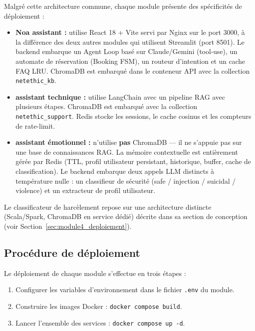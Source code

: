 Malgré cette architecture commune, chaque module présente des spécificités de déploiement :

\begin{itemize}
  \item \textbf{Noa assistant :} utilise React 18 + Vite servi par Nginx sur le port 3000,
        à la différence des deux autres modules qui utilisent Streamlit (port 8501).
        Le backend embarque un Agent Loop basé sur Claude/Gemini (tool-use),
        un automate de réservation (Booking FSM), un routeur d'intention et un cache FAQ LRU.
        ChromaDB est embarqué dans le conteneur API avec la collection \texttt{netethic\_kb}.

  \item \textbf{assistant technique :} utilise LangChain avec un pipeline RAG avec plusieurs étapes.
        ChromaDB est embarqué avec la collection \texttt{netethic\_support}.
        Redis stocke les sessions, le cache cosinus et les compteurs de rate-limit.

  \item \textbf{assistant émotionnel :} n'utilise \textbf{pas} ChromaDB — il ne s'appuie pas
        sur une base de connaissances RAG. La mémoire contextuelle est entièrement gérée par Redis
        (TTL, profil utilisateur persistant, historique, buffer, cache de classification).
        Le backend embarque deux appels LLM distincts à température nulle :
        un classifieur de sécurité (safe / injection / suicidal / violence)
        et un extracteur de profil utilisateur.
\end{itemize}

Le classificateur de harcèlement repose sur une architecture distincte (Scala/Spark, ChromaDB en service dédié)
décrite dans sa section de conception (voir Section~\ref{sec:module4_deploiement}).

\subsection{Procédure de déploiement}

Le déploiement de chaque module s'effectue en trois étapes :
\begin{enumerate}
    \item Configurer les variables d'environnement dans le fichier \texttt{.env} du module.
    \item Construire les images Docker : \texttt{docker compose build}.
    \item Lancer l'ensemble des services : \texttt{docker compose up -d}.
\end{enumerate}

